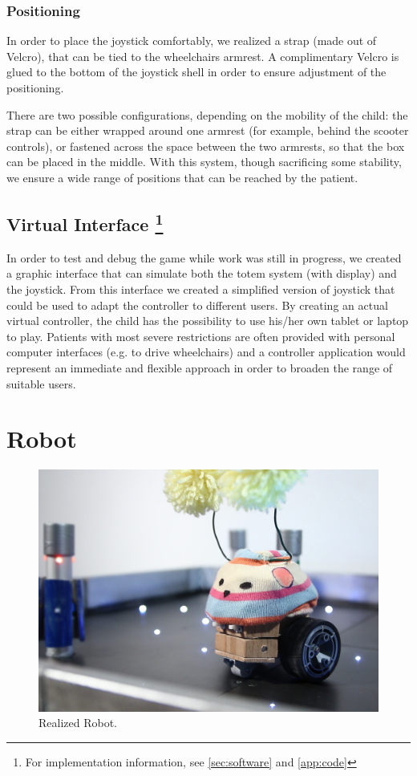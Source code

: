 \documentclass[a4paper,twoside]{book}
\begin{document}
\subsubsection{Positioning}

In order to place the joystick comfortably, we realized a strap (made out of Velcro), that can be tied to the wheelchairs armrest. A complimentary Velcro is glued to the bottom of the joystick shell in order to ensure adjustment of the positioning. 

There are two possible configurations, depending on the mobility of the child: the strap can be either wrapped around one armrest (for example, behind the scooter controls), or fastened across the space between the two armrests, so that the box can be placed in the  middle. With this system, though sacrificing some stability, we ensure a wide range of positions that can be reached by the patient.

\subsection[Virtual Interface]{Virtual Interface \footnote{For implementation information, see \autoref{sec:software} and \autoref{app:code}}}
In order to test and debug the game while work was still in progress, we created a graphic interface that can simulate both the totem system (with display) and the joystick. From this interface we created a simplified version of joystick that could be used to adapt the controller to different users. By creating an actual virtual controller, the child has the possibility to use his/her own tablet or laptop to play. Patients with most severe restrictions are often provided with personal computer interfaces (e.g. to drive wheelchairs) and a controller application would represent an immediate and flexible approach in order to broaden the range of suitable users.

\section{Robot}

\begin{figure}[h]
\centering
\includegraphics[width=0.8\linewidth]{img/IMG_20160827_163033_1} 
\caption{Realized Robot.}
\end{figure}
\end{document}
